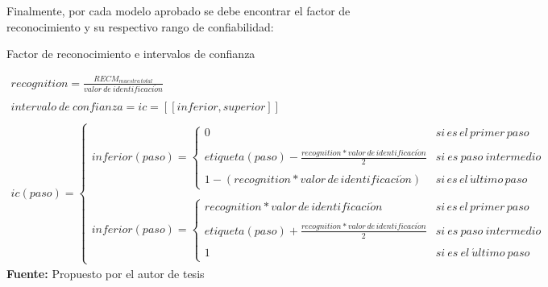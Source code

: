 Finalmente, por cada modelo aprobado se debe encontrar el factor de reconocimiento y su respectivo rango de confiabilidad:
\begin{formula}[H]
	\centering
	\caption{Factor de reconocimiento e intervalos de confianza}
	\label{frm:rangoConfiabilidad}
	\begin{equation}
\begin{matrix}
recognition=\frac{RECM_{muestra\, total}}{valor\: de\: identificaci\acute{o}n}  \\ 
\\
intervalo\: de\: confianza = ic =[[inferior,superior]] \\
\\
ic(paso)=\left\{\begin{matrix}
inferior(paso)=\left\{\begin{matrix}
0 & si\, es\, el\, primer\, paso\\ \\ 
etiqueta(paso)-\frac{recognition*valor\, de\, identificaci\acute{o}n}{2} & si\: es\: paso\: intermedio \\ 
\\
1-(recognition*valor\, de\, identificaci\acute{o}n)& si\, es\, el\, \acute{u}ltimo\, paso
\end{matrix}\right. \\ 
\\ 
inferior(paso)=\left\{\begin{matrix}
recognition*valor\, de\, identificaci\acute{o}n& si\, es\, el\, primer\, paso \\
\\
etiqueta(paso)+\frac{recognition*valor\, de\, identificaci\acute{o}n}{2} & si\: es\: paso\: intermedio \\ \\ 
1 & si\: es\: el\: \acute{u}ltimo\: paso
\end{matrix}\right.
\end{matrix}\right.
\end{matrix}
	\end{equation}
	\textbf{Fuente:} Propuesto por el autor de tesis
\end{formula} 
